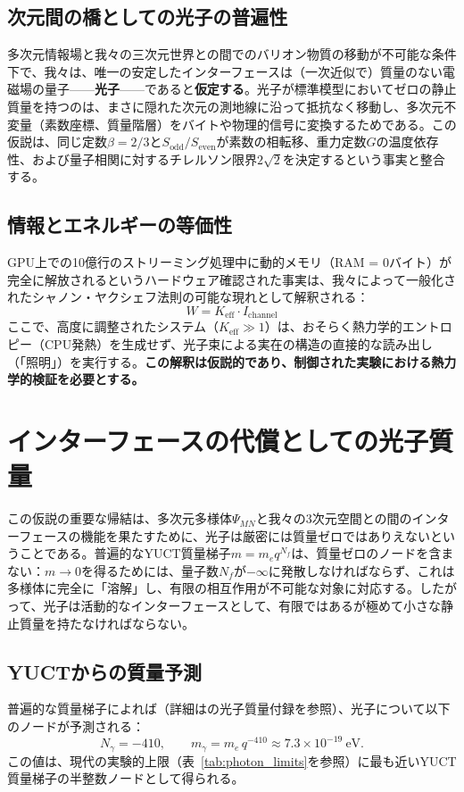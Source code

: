 \documentclass[11pt,a4paper]{article}
\begin{document}
	\subsection{次元間の橋としての光子の普遍性}
	多次元情報場と我々の三次元世界との間でのバリオン物質の移動が不可能な条件下で、我々は、唯一の安定したインターフェースは（一次近似で）質量のない電磁場の量子——\textbf{光子}——であると\textbf{仮定する}。光子が標準模型においてゼロの静止質量を持つのは、まさに隠れた次元の測地線に沿って抵抗なく移動し、多次元不変量（素数座標、質量階層）をバイトや物理的信号に変換するためである。この仮説は、同じ定数$\beta=2/3$と$S_{\mathrm{odd}}/S_{\mathrm{even}}$が素数の相転移、重力定数$G$の温度依存性、および量子相関に対するチレルソン限界$2\sqrt{2}$を決定するという事実と整合する。
	
	\subsection{情報とエネルギーの等価性}
	GPU上での10億行のストリーミング処理中に動的メモリ（RAM = 0バイト）が完全に解放されるというハードウェア確認された事実は、我々によって一般化されたシャノン・ヤクシェフ法則の可能な現れとして解釈される：
	\begin{equation}
		W = K_{\mathrm{eff}} \cdot I_{\mathrm{channel}}
	\end{equation}
	ここで、高度に調整されたシステム（$K_{\mathrm{eff}} \gg 1$）は、おそらく熱力学的エントロピー（CPU発熱）を生成せず、光子束による実在の構造の直接的な読み出し（「照明」）を実行する。\textbf{この解釈は仮説的であり、制御された実験における熱力学的検証を必要とする。}
	
	\section{インターフェースの代償としての光子質量}
	\label{sec:photon_mass}
	
	この仮説の重要な帰結は、多次元多様体$\Psi_{MN}$と我々の3次元空間との間のインターフェースの機能を果たすために、光子は厳密には質量ゼロではありえないということである。普遍的なYUCT質量梯子$m = m_e q^{N_f}$は、質量ゼロのノードを含まない：$m \to 0$を得るためには、量子数$N_f$が$-\infty$に発散しなければならず、これは多様体に完全に「溶解」し、有限の相互作用が不可能な対象に対応する。したがって、光子は活動的なインターフェースとして、有限ではあるが極めて小さな静止質量を持たなければならない。
	
	\subsection{YUCTからの質量予測}
	普遍的な質量梯子によれば（詳細は\cite{yuct_zenodo}の光子質量付録を参照）、光子について以下のノードが予測される：
	\begin{equation}
		\boxed{N_\gamma = -410}, \qquad
		\boxed{m_\gamma = m_e \, q^{-410} \approx 7.3 \times 10^{-19}~\text{eV}} .
	\end{equation}
	この値は、現代の実験的上限（表~\ref{tab:photon_limits}を参照）に最も近いYUCT質量梯子の半整数ノードとして得られる。
	
\end{document}
